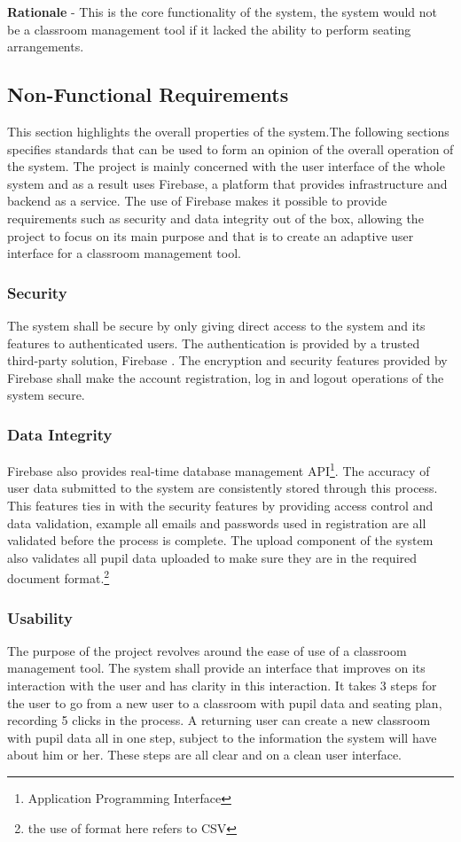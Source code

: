 \textbf{Rationale} - This is the core functionality of the system, the system would not be a classroom management tool if it lacked the ability to perform seating arrangements.

\subsection{Non-Functional Requirements}
This section highlights the overall properties of the system.The following sections specifies standards that can be used to form an opinion of the overall operation of the system. The project is mainly concerned with the user interface of the whole system and as a result uses Firebase\cite{website:Firebase}, a platform that provides infrastructure and backend as a service. The use of Firebase makes it possible to provide requirements such as security and data integrity out of the box, allowing the project to focus on its main purpose and that is to create an adaptive user interface for a classroom management tool.

\subsubsection{Security}
The system shall be secure by only giving direct access to the system and its features to authenticated users. The authentication is provided by a trusted third-party solution, Firebase \cite{website:Firebase}. The encryption and security features provided by Firebase shall make the account registration, log in and logout operations of the system secure.

\subsubsection{Data Integrity}
Firebase also provides real-time database management API\footnote{Application Programming Interface}. The accuracy of user data submitted to the system are consistently stored through this process. This features ties in with the security features by providing access control and data validation, example all emails and passwords used in registration are all validated before the process is complete. The upload component of the system also validates all pupil data uploaded to make sure they are in the required document format.\footnote{the use of format here refers to CSV}

\subsubsection{Usability}
The purpose of the project revolves around the ease of use of a classroom management tool. The system shall provide an interface that improves on its interaction with the user and has clarity in this interaction. It takes 3 steps for the user to go from a new user to a classroom with pupil data and seating plan, recording 5 clicks in the process. A returning user can create a new classroom with pupil data all in one step, subject to the information the system will have about him or her. These steps are all clear and on a clean user interface. 

